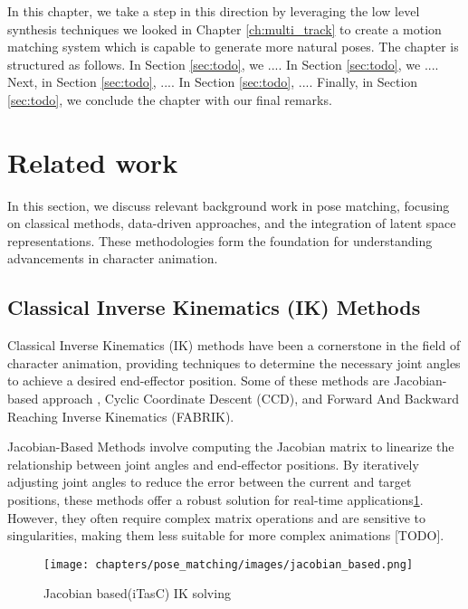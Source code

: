 \documentclass[../../main.tex]{subfiles}
\begin{document}
In this chapter, we take a step in this direction by leveraging the low level synthesis techniques we looked in Chapter \ref{ch:multi_track} to create a motion matching system which is capable to generate more natural poses.
The chapter is structured as follows. In Section \ref{sec:todo}, we .... In Section \ref{sec:todo}, we .... Next, in Section \ref{sec:todo}, .... In Section \ref{sec:todo}, .... Finally, in Section \ref{sec:todo}, we conclude the chapter with our final remarks.

\section{Related work}
\label{sec:related_work}

In this section, we discuss relevant background work in pose matching, focusing on classical methods, data-driven approaches, and the integration of latent space representations. These methodologies form the foundation for understanding advancements in character animation.

\subsection{Classical Inverse Kinematics (IK) Methods}
\label{subsec:classical_ik}

Classical Inverse Kinematics (IK) methods have been a cornerstone in the field of character animation, providing techniques to determine the necessary joint angles to achieve a desired end-effector position. Some of these methods are Jacobian-based approach \cite{TODO itasc}, Cyclic Coordinate Descent (CCD)\cite{TODO}, and Forward And Backward Reaching Inverse Kinematics (FABRIK)\cite{TODO}.

Jacobian-Based Methods involve computing the Jacobian matrix to linearize the relationship between joint angles and end-effector positions. By iteratively adjusting joint angles to reduce the error between the current and target positions, these methods offer a robust solution for real-time applications\ref{fig:jacobian_based}. However, they often require complex matrix operations and are sensitive to singularities, making them less suitable for more complex animations [TODO].

\begin{figure}
    \centering \texttt{[image: chapters/pose\_matching/images/jacobian\_based.png]}
    \caption{Jacobian based(iTasC) IK solving}
    \label{fig:jacobian_based}
\end{figure}
\end{document}
